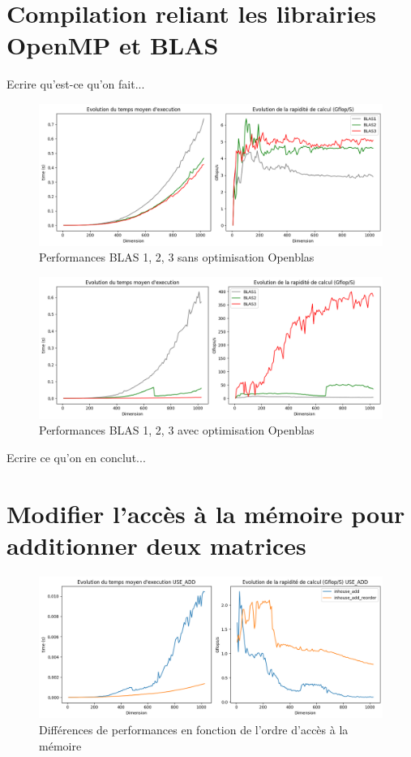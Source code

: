 \documentclass{report}
\begin{document}
\tableofcontents

\newpage


\chapter{Compilation reliant les librairies OpenMP et BLAS}

Ecrire qu'est-ce qu'on fait...

\begin{figure}[H]
    \centering
    \includegraphics[width=0.7\linewidth]{images/fig1.png}
    \caption{Performances BLAS 1, 2, 3 sans optimisation Openblas}
    \label{fig:1}
\end{figure}

\begin{figure}[H]
    \centering
    \includegraphics[width=0.7\linewidth]{images/fig2.png}
    \caption{Performances BLAS 1, 2, 3 avec optimisation Openblas}
    \label{fig:2}
\end{figure}

Ecrire ce qu'on en conclut...

\chapter{Modifier l'accès à la mémoire pour additionner deux matrices}

\begin{figure}[H]
    \centering
    \includegraphics[width=0.7\linewidth]{images/fig3.png}
    \caption{Différences de performances en fonction de l'ordre d'accès à la mémoire}
    \label{fig:3}
\end{figure}
\end{document}
